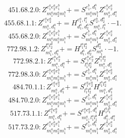 \documentclass[letterpaper,10pt,fleqn,leqno,onecolumn]{article}
\begin{document}
\begin{equation} \;\;\;\;\;\;  451.68.2.0: Z^{e_{1}^{a}e_{2}^{a}e_{1}^{b}}_{m_{1}^{a}m_{2}^{a}m_{1}^{b}}+=S^{e_{1}^{b},d_{1}^{a}}_{m_{1}^{a}m_{1}^{b}}Z^{e_{1}^{a}e_{2}^{a}}_{m_{2}^{a},d_{1}^{a}} \end{equation}
\begin{equation} \;\;\;\;\;\;  455.68.1.1: Z^{e_{1}^{a}e_{2}^{a}}_{m_{1}^{a},d_{1}^{a}}+=H^{e_{1}^{a},l_{1}^{a}}_{d_{1}^{a},d_{2}^{a}}S^{e_{2}^{a},d_{2}^{a}}_{m_{1}^{a},l_{1}^{a}}\cdot -1. \end{equation}
\begin{equation} \;\;\;\;\;\;  455.68.2.0: Z^{e_{1}^{a}e_{2}^{a}e_{1}^{b}}_{m_{1}^{a}m_{2}^{a}m_{1}^{b}}+=S^{e_{1}^{b},d_{1}^{a}}_{m_{1}^{a}m_{1}^{b}}Z^{e_{1}^{a}e_{2}^{a}}_{m_{2}^{a},d_{1}^{a}} \end{equation}
\begin{equation} \;\;\;\;\;\;  772.98.1.2: Z^{l_{1}^{a}l_{2}^{a}}_{m_{1}^{a},d_{1}^{a}}+=H^{l_{1}^{a}l_{2}^{a}}_{d_{1}^{a},d_{2}^{a}}S^{d_{2}^{a}}_{m_{1}^{a}}\cdot -1. \end{equation}
\begin{equation} \;\;\;\;\;\;  772.98.2.1: Z^{e_{1}^{a}e_{2}^{a}}_{m_{1}^{a},d_{1}^{a}}+=S^{e_{1}^{a}e_{2}^{a}}_{l_{1}^{a}l_{2}^{a}}Z^{l_{1}^{a}l_{2}^{a}}_{m_{1}^{a},d_{1}^{a}} \end{equation}
\begin{equation} \;\;\;\;\;\;  772.98.3.0: Z^{e_{1}^{a}e_{2}^{a}e_{1}^{b}}_{m_{1}^{a}m_{2}^{a}m_{1}^{b}}+=S^{e_{1}^{b},d_{1}^{a}}_{m_{1}^{a}m_{1}^{b}}Z^{e_{1}^{a}e_{2}^{a}}_{m_{2}^{a},d_{1}^{a}} \end{equation}
\begin{equation} \;\;\;\;\;\;  484.70.1.1: Z^{e_{1}^{a}e_{2}^{a}}_{m_{1}^{a},d_{1}^{a}}+=S^{e_{1}^{a}e_{2}^{a}}_{l_{1}^{a}l_{2}^{a}}H^{l_{1}^{a}l_{2}^{a}}_{m_{1}^{a},d_{1}^{a}} \end{equation}
\begin{equation} \;\;\;\;\;\;  484.70.2.0: Z^{e_{1}^{a}e_{2}^{a}e_{1}^{b}}_{m_{1}^{a}m_{2}^{a}m_{1}^{b}}+=S^{e_{1}^{b},d_{1}^{a}}_{m_{1}^{a}m_{1}^{b}}Z^{e_{1}^{a}e_{2}^{a}}_{m_{2}^{a},d_{1}^{a}} \end{equation}
\begin{equation} \;\;\;\;\;\;  517.73.1.1: Z^{e_{1}^{a}e_{2}^{a}}_{m_{1}^{a},d_{1}^{a}}+=S^{e_{1}^{a}e_{2}^{a},d_{1}^{b}}_{m_{1}^{a},l_{1}^{a}l_{1}^{b}}H^{l_{1}^{a}l_{1}^{b}}_{d_{1}^{b},d_{1}^{a}} \end{equation}
\begin{equation} \;\;\;\;\;\;  517.73.2.0: Z^{e_{1}^{a}e_{2}^{a}e_{1}^{b}}_{m_{1}^{a}m_{2}^{a}m_{1}^{b}}+=S^{e_{1}^{b},d_{1}^{a}}_{m_{1}^{a}m_{1}^{b}}Z^{e_{1}^{a}e_{2}^{a}}_{m_{2}^{a},d_{1}^{a}} \end{equation}
\end{document}
